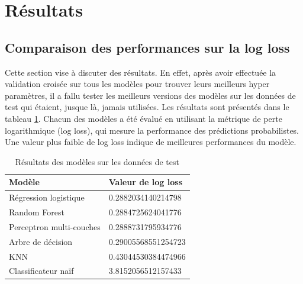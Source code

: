 \documentclass[12pt]{article}
\begin{document}
\newpage
\section{Résultats}
\label{sec:results}
\subsection{Comparaison des performances sur la log loss}
Cette section vise à discuter des résultats.
En effet, après avoir effectuée la validation croisée sur tous les modèles pour trouver leurs meilleurs hyper paramètres, il a fallu tester les meilleurs versions des modèles sur les données de test qui étaient, jusque là, jamais utilisées.
Les résultats sont présentés dans le tableau \ref{tab:results}.
Chacun des modèles a été évalué en utilisant la métrique de perte logarithmique (log loss), qui mesure la performance des prédictions probabilistes. 
Une valeur plus faible de log loss indique de meilleures performances du modèle.

\begin{table}[htp]
    \centering
    \begin{tabular}{|l|l|}
    \hline
    \textbf{Modèle}          & \textbf{Valeur de log loss} \\ \hline
    Régression logistique    & 0.2882034140214798          \\ \hline
    Random Forest            & 0.2884725624041776          \\ \hline
    Perceptron multi-couches & 0.2888731795934776          \\ \hline
    Arbre de décision        & 0.29005568551254723         \\ \hline
    KNN                      & 0.43044530384474966         \\ \hline
    Classificateur naïf      & 3.8152056512157433          \\ \hline
    \end{tabular}
    \caption{Résultats des modèles sur les données de test}
    \label{tab:results}
\end{table}
\end{document}
